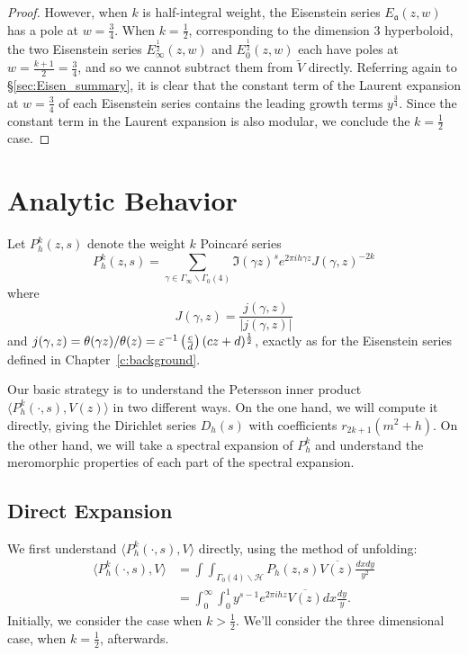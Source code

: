 \begin{proof}
However, when $k$ is half-integral weight, the Eisenstein series
$E_\mathfrak{a}(z,w)$ has a pole at $w = \frac{3}{4}$.
When $k = \frac{1}{2}$, corresponding to the dimension $3$ hyperboloid,
the two Eisenstein series $E^{\frac{1}{2}}_\infty(z,w)$ and
$E_0^{\frac{1}{2}}(z,w)$ each have poles at
$w = \frac{k+1}{2} = \frac{3}{4}$, and so we cannot subtract
them from $\widetilde{V}$ directly.
Referring again to \S\ref{sec:Eisen_summary}, it is clear that the constant term of the
Laurent expansion at $w = \frac{3}{4}$ of each Eisenstein series contains the leading
growth terms $y^{\frac{3}{4}}$.
Since the constant term in the Laurent expansion is also modular, we conclude the $k =
\frac{1}{2}$ case.
%
\end{proof}




\section{Analytic Behavior}



Let $P_h^k(z,s)$ denote the weight $k$ Poincar\'e series
\begin{equation}
  P_h^k(z,s) = \sum_{\gamma \in \Gamma_\infty \backslash \Gamma_0(4)} \Im(\gamma z)^s
  e^{2\pi i h \gamma z} J(\gamma, z)^{-2k}
\end{equation}
where
\begin{equation}
  J(\gamma, z) = \frac{j(\gamma, z)}{\lvert j(\gamma, z) \rvert}
\end{equation}
and $j(\gamma, z) = \theta(\gamma z)/\theta(z) = \varepsilon^{-1} \left(\frac{c}{d}\right)
(cz+d)^{\frac{1}{2}}$, exactly as for the Eisenstein series defined in
Chapter~\ref{c:background}.


Our basic strategy is to understand the Petersson inner product $\langle P_h^k(\cdot, s),
V(z) \rangle$ in two different ways.
On the one hand, we will compute it directly, giving the Dirichlet series $D_h(s)$ with
coefficients $r_{2k+1}(m^2 + h)$.
On the other hand, we will take a spectral expansion of $P_h^k$ and understand the
meromorphic properties of each part of the spectral expansion.



\subsection{Direct Expansion}\label{ssec:direct_expansion}



We first understand $\langle P_h^k(\cdot, s), V \rangle$ directly, using the method of
unfolding:
\begin{align}
  \langle P_h^k(\cdot, s), V \rangle &= \int \int_{\Gamma_0(4) \backslash \mathcal{H}}
  P_h(z,s) \overline{V(z)} \frac{dx dy}{y^2} \\
  &= \int_0^\infty \int_0^1 y^{s-1} e^{2\pi i h z} \overline{V(z)} dx \frac{dy}{y}.
\end{align}
Initially, we consider the case when $k > \frac{1}{2}$.
We'll consider the three dimensional case, when $k = \frac{1}{2}$, afterwards.



